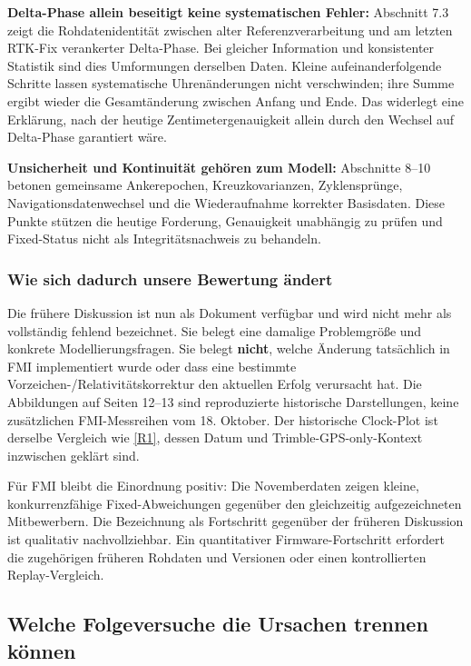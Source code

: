 \documentclass[11pt,a4paper]{article}
\numberwithin{equation}{section}
\numberwithin{figure}{section}
\begin{document}
\textbf{Delta-Phase allein beseitigt keine systematischen Fehler:} Abschnitt 7.3 zeigt die Rohdatenidentität zwischen alter Referenzverarbeitung und am letzten RTK-Fix verankerter Delta-Phase. Bei gleicher Information und konsistenter Statistik sind dies Umformungen derselben Daten. Kleine aufeinanderfolgende Schritte lassen systematische Uhrenänderungen nicht verschwinden; ihre Summe ergibt wieder die Gesamtänderung zwischen Anfang und Ende. Das widerlegt eine Erklärung, nach der heutige Zentimetergenauigkeit allein durch den Wechsel auf Delta-Phase garantiert wäre.

\textbf{Unsicherheit und Kontinuität gehören zum Modell:} Abschnitte 8–10 betonen gemeinsame Ankerepochen, Kreuzkovarianzen, Zyklensprünge, Navigationsdatenwechsel und die Wiederaufnahme korrekter Basisdaten. Diese Punkte stützen die heutige Forderung, Genauigkeit unabhängig zu prüfen und Fixed-Status nicht als Integritätsnachweis zu behandeln.

\subsubsection{Wie sich dadurch unsere Bewertung ändert}

Die frühere Diskussion ist nun als Dokument verfügbar und wird nicht mehr als vollständig fehlend bezeichnet. Sie belegt eine damalige Problemgröße und konkrete Modellierungsfragen. Sie belegt \textbf{nicht}, welche Änderung tatsächlich in FMI implementiert wurde oder dass eine bestimmte Vorzeichen-/\allowbreak{}Relativitätskorrektur den aktuellen Erfolg verursacht hat. Die Abbildungen auf Seiten 12–13 sind reproduzierte historische Darstellungen, keine zusätzlichen FMI-Messreihen vom 18. Oktober. Der historische Clock-Plot ist derselbe Vergleich wie \hyperlink{ref-R1}{[R1]}, dessen Datum und Trimble-GPS-only-Kontext inzwischen geklärt sind.

Für FMI bleibt die Einordnung positiv: Die Novemberdaten zeigen kleine, konkurrenzfähige Fixed-Abweichungen gegenüber den gleichzeitig aufgezeichneten Mitbewerbern. Die Bezeichnung als Fortschritt gegenüber der früheren Diskussion ist qualitativ nachvollziehbar. Ein quantitativer Firmware-Fortschritt erfordert die zugehörigen früheren Rohdaten und Versionen oder einen kontrollierten Replay-Vergleich.

\subsection{Welche Folgeversuche die Ursachen trennen können}
\end{document}
